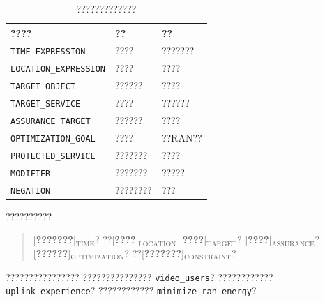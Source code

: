 \begin{table}[H]
    \centering
    \caption{?????????????}
    \label{tab:intent_slots_reduced}
    \small
    \renewcommand{\arraystretch}{1.25}
    \begin{tabularx}{\textwidth}{
        >{\raggedright\arraybackslash}p{}
        >{\raggedright\arraybackslash}p{}
        >{\raggedright\arraybackslash}X
    }
        \toprule
        ???? & ?? & ?? \\
        \midrule

        \texttt{TIME\_EXPRESSION}
        & ????
        & ???????
        \\

        \texttt{LOCATION\_EXPRESSION}
        & ????
        & ????
        \\

        \texttt{TARGET\_OBJECT}
        & ??????
        & ????
        \\

        \texttt{TARGET\_SERVICE}
        & ????
        & ??????
        \\

        \texttt{ASSURANCE\_TARGET}
        & ??????
        & ????
        \\

        \texttt{OPTIMIZATION\_GOAL}
        & ????
        & ??RAN??
        \\

        \texttt{PROTECTED\_SERVICE}
        & ???????
        & ????
        \\

        \texttt{MODIFIER}
        & ???????
        & ?????
        \\

        \texttt{NEGATION}
        & ????????
        & ???
        \\

        \bottomrule
    \end{tabularx}
\end{table}

??????????

\begin{quote}
[\textbf{???????}]$_{\mathrm{TIME}}$?
??[\textbf{????}]$_{\mathrm{LOCATION}}$
[\textbf{????}]$_{\mathrm{TARGET}}$?
[\textbf{????}]$_{\mathrm{ASSURANCE}}$?
[\textbf{??????}]$_{\mathrm{OPTIMIZATION}}$?
??[\textbf{???????}]$_{\mathrm{CONSTRAINT}}$?
\end{quote}

????????????????
???????????????
\texttt{video\_users}?
????????????
\texttt{uplink\_experience}?
????????????
\texttt{minimize\_ran\_energy}?

